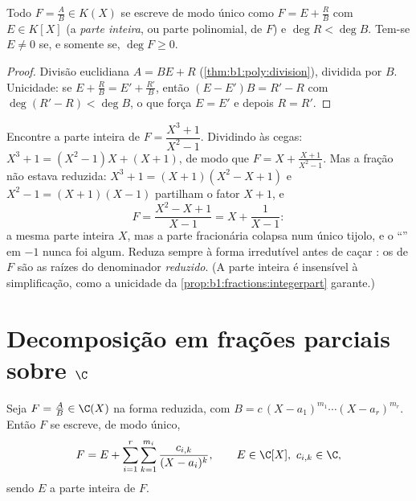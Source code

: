 \begin{proposition}\label{prop:b1:fractions:integerpart}
Todo $F = \frac AB \in K(X)$ se escreve de modo único como $F = E + \frac RB$ com $E
\in K[X]$ (a \emph{parte inteira}, ou parte polinomial, de $F$) e
$\deg R < \deg B$. Tem-se $E \neq 0$ se, e somente se, $\deg F \geq 0$.
\end{proposition}

\begin{proof}
Divisão euclidiana $A = BE + R$ (\cref{thm:b1:poly:division}), dividida
por $B$. Unicidade: se $E + \frac RB = E' + \frac{R'}{B}$, então $(E -
E')B = R' - R$
com $\deg(R' - R) < \deg B$, o que força $E = E'$ e depois $R
= R'$.
\end{proof}

\begin{example}\label{ex:b1:fractions:integerpart}
Encontre a parte inteira de $F = \dfrac{X^3 + 1}{X^2 - 1}$. Dividindo
às cegas: $X^3 + 1 = (X^2 - 1)X + (X + 1)$, de modo que $F = X +
\frac{X + 1}{X^2 - 1}$. Mas a fração não estava reduzida: $X^3 + 1
= (X + 1)(X^2 - X + 1)$ e $X^2 - 1 = (X+1)(X-1)$ partilham o fator
$X + 1$, e
\[
F = \frac{X^2 - X + 1}{X - 1} = X + \frac{1}{X - 1} :
\]
a mesma parte inteira $X$, mas a parte fracionária colapsa num
único tijolo, e o ``'' em $-1$ nunca foi  algum.
Reduza sempre à forma irredutível antes de caçar : os  de
$F$ são as raízes do denominador \emph{reduzido}. (A parte inteira
é insensível à simplificação, como a unicidade da
\cref{prop:b1:fractions:integerpart} garante.)
\end{example}

\section{Decomposição em frações parciais sobre $\C$}

\begin{theorem}\label{thm:b1:fractions:complex}
Seja $F = \frac AB \in \C(X)$ na forma reduzida, com $B = c\,(X -
a_1)^{m_1} \cdots (X - a_r)^{m_r}$. Então $F$ se escreve, de modo único,
\[
F = E + \sum_{i=1}^{r} \sum_{k=1}^{m_i}
\frac{c_{i,k}}{(X - a_i)^k},
\qquad E \in \C[X],\ c_{i,k} \in \C ,
\]
sendo $E$ a parte inteira de $F$.
\end{theorem}

